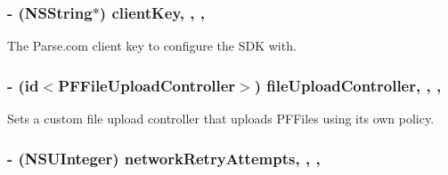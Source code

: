 \subsubsection[{client\+Key}]{\setlength{\rightskip}{0pt plus 5cm}-\/ (N\+S\+String$\ast$) client\+Key\hspace{0.3cm}{\ttfamily [read]}, {\ttfamily [write]}, {\ttfamily [nonatomic]}, {\ttfamily [copy]}}\label{protocol_parse_mutable_client_configuration-p_a6c73abadbf4fc85fe62e5e7477f0f78f}
The Parse.\+com client key to configure the S\+D\+K with. \hypertarget{protocol_parse_mutable_client_configuration-p_a9f3487a92978a6f57853b73174e23b35}{}
\subsubsection[{file\+Upload\+Controller}]{\setlength{\rightskip}{0pt plus 5cm}-\/ (id$<${\bf P\+F\+File\+Upload\+Controller}$>$) file\+Upload\+Controller\hspace{0.3cm}{\ttfamily [read]}, {\ttfamily [write]}, {\ttfamily [nonatomic]}, {\ttfamily [strong]}}\label{protocol_parse_mutable_client_configuration-p_a9f3487a92978a6f57853b73174e23b35}
Sets a custom file upload controller that uploads P\+F\+Files using its own policy. \hypertarget{protocol_parse_mutable_client_configuration-p_a3f32025c46ed41103e5833b6b63eae1c}{}
\subsubsection[{network\+Retry\+Attempts}]{\setlength{\rightskip}{0pt plus 5cm}-\/ (N\+S\+U\+Integer) network\+Retry\+Attempts\hspace{0.3cm}{\ttfamily [read]}, {\ttfamily [write]}, {\ttfamily [nonatomic]}, {\ttfamily [assign]}}\label{protocol_parse_mutable_client_configuration-p_a3f32025c46ed41103e5833b6b63eae1c}




 





